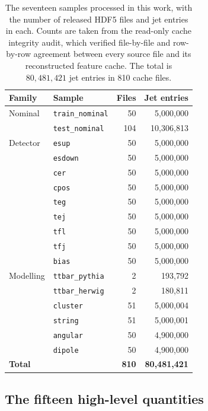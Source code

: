 \documentclass[pdflatex,sn-mathphys,Numbered,iicol]{sn-jnl}
\begin{document}
\begin{table}[t]
\centering\small
\caption{The seventeen samples processed in this work, with the number of released
  HDF5 files and jet entries in each. Counts are taken from the read-only cache
  integrity audit, which verified file-by-file and row-by-row agreement between every
  source file and its reconstructed feature cache. The total is
  $80{,}481{,}421$ jet entries in 810 cache files.}
\label{tab:datasets}
\begin{tabular}{llrr}
\toprule
Family & Sample & Files & Jet entries \\
\midrule
Nominal   & \texttt{train\_nominal} & 50  & 5{,}000{,}000 \\
          & \texttt{test\_nominal}  & 104 & 10{,}306{,}813 \\
\midrule
Detector  & \texttt{esup}    & 50 & 5{,}000{,}000 \\
          & \texttt{esdown}  & 50 & 5{,}000{,}000 \\
          & \texttt{cer}     & 50 & 5{,}000{,}000 \\
          & \texttt{cpos}    & 50 & 5{,}000{,}000 \\
          & \texttt{teg}     & 50 & 5{,}000{,}000 \\
          & \texttt{tej}     & 50 & 5{,}000{,}000 \\
          & \texttt{tfl}     & 50 & 5{,}000{,}000 \\
          & \texttt{tfj}     & 50 & 5{,}000{,}000 \\
          & \texttt{bias}    & 50 & 5{,}000{,}000 \\
\midrule
Modelling & \texttt{ttbar\_pythia} &  2 &   193{,}792 \\
          & \texttt{ttbar\_herwig} &  2 &   180{,}811 \\
          & \texttt{cluster}       & 51 & 5{,}000{,}004 \\
          & \texttt{string}        & 51 & 5{,}000{,}001 \\
          & \texttt{angular}       & 50 & 4{,}900{,}000 \\
          & \texttt{dipole}        & 50 & 4{,}900{,}000 \\
\midrule
\multicolumn{2}{l}{\textbf{Total}} & \textbf{810} & \textbf{80{,}481{,}421} \\
\bottomrule
\end{tabular}
\end{table}

\subsection{The fifteen high-level quantities}
\label{sec:hlq}
\end{document}
